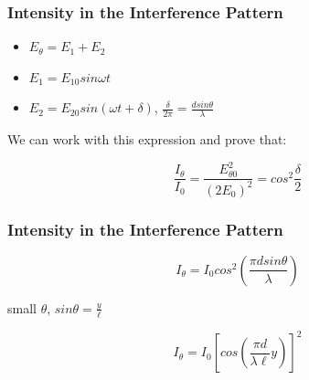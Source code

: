 \documentclass[]{beamer}
\begin{document}






\begin{frame}

\frametitle{Intensity in the Interference Pattern}



\begin{itemize}

\item $E_{\theta}=E_1+E_2$
\pause

\item $E_1=E_{10}sin\omega t$
\pause

\item $E_2=E_{20}sin(\omega t+\delta)$, $\frac{\delta}{2\pi}=\frac{dsin\theta}{\lambda}$


\end{itemize}

We can work with this expression and prove that:

\begin{equation}
\frac{I_{\theta}}{I_0}=\frac{E^2_{\theta 0}}{(2E_0)^2}=cos^2\frac{\delta}{2}
\end{equation}

  \end{frame}
  
  
  



\begin{frame}

\frametitle{Intensity in the Interference Pattern}






\begin{equation}
I_{\theta}=I_0cos^2\left(\frac{\pi d sin \theta}{\lambda}\right)
\end{equation}

\pause
small $\theta$, $sin\theta=\frac{y}{\ell}$


\begin{equation}
I_{\theta}=I_0\left[cos\left(\frac{\pi d }{\lambda \ell} y\right)\right]^2
\end{equation}


  \end{frame}
\end{document}
